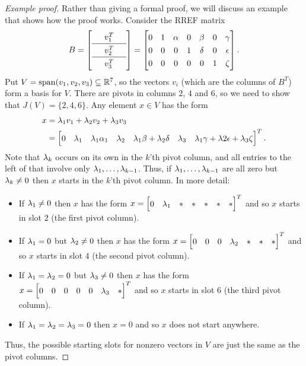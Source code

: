\documentclass[reqno]{amsart}
\theoremstyle{definition}
\begin{document}
\begin{proof}[Example proof]
 Rather than giving a formal proof, we will discuss an example that
 shows how the proof works.  Consider the RREF matrix
 \[ {\renewcommand{\arraystretch}{1.3}
    B = \left[\begin{array}{ccc}
          & v_1^T & \\ \hline
          & v_2^T & \\ \hline
          & v_3^T &
        \end{array}\right]}
     =
    \bbm
     0 & 1 & \al & 0 & \bt & 0 & \gm \\
     0 & 0 &  0  & 1 & \dl & 0 & \ep \\
     0 & 0 &  0  & 0 &  0  & 1 & \zt
    \ebm.
 \]
 Put $V=\operatorname{span}(v_1,v_2,v_3)\subseteq{\mathbb{R}}^7$, so the vectors $v_i$ (which are
 the columns of $B^T$) form a basis for $V$.  There are pivots in
 columns $2$, $4$ and $6$, so we need to show that $J(V)=\{2,4,6\}$.
 Any element $x\in V$ has the form
 \begin{align*}
  x &= \lm_1v_1+\lm_2v_2+\lm_3v_3 \\
    &= \bbm 0 & \lm_1 & \lm_1\al_1 & \lm_2 &
            \lm_1\bt+\lm_2\dl & \lm_3 &
            \lm_1\gm+\lm2\ep+\lm_3\zt \ebm^T.
 \end{align*}
 Note that $\lambda_k$ occurs on its own in the $k$'th pivot column, and
 all entries to the left of that involve only
 $\lambda_1,\dotsc,\lambda_{k-1}$.  Thus, if $\lambda_1,\dotsc,\lambda_{k-1}$ are all
 zero but $\lambda_k\neq 0$ then $x$ starts in the $k$'th pivot column.
 In more detail:
 \begin{itemize}
  \item If $\lambda_1\neq 0$ then $x$ has the form
   $x=\bbm 0&\lm_1&*&*&*&*&*\ebm^T$ and so $x$ starts in slot $2$ (the
   first pivot column).
  \item If $\lambda_1=0$ but $\lambda_2\neq 0$ then $x$ has the form
   $x=\bbm 0&0&0&\lm_2&*&*&*\ebm^T$ and so $x$ starts in slot $4$ (the
   second pivot column).
  \item If $\lambda_1=\lambda_2=0$ but $\lambda_3\neq 0$ then $x$ has the form
   $x=\bbm 0&0&0&0&0&\lm_3&*\ebm^T$ and so $x$ starts in slot $6$ (the
   third pivot column).
  \item If $\lambda_1=\lambda_2=\lambda_3=0$ then $x=0$ and so $x$ does not start
   anywhere.
 \end{itemize}
 Thus, the possible starting slots for nonzero vectors in $V$ are just
 the same as the pivot columns.
\end{proof}
\end{document}
